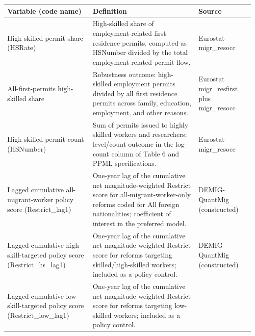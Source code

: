 \documentclass[11pt,a4paper]{article}
\newcounter{none}
\begin{document}
{\scriptsize\setlength{\tabcolsep}{2.5pt}\renewcommand{\arraystretch}{1.00} %
\begin{longtable}[]{@{}
  >{\raggedright\arraybackslash}p{}
  >{\raggedright\arraybackslash}p{}
  >{\raggedright\arraybackslash}p{}@{}}
\toprule\noalign{}
\begin{minipage}[b]{\linewidth}\raggedright
\textbf{Variable (code name)}
\end{minipage} & \begin{minipage}[b]{\linewidth}\raggedright
\textbf{Definition}
\end{minipage} & \begin{minipage}[b]{\linewidth}\raggedright
\textbf{Source}
\end{minipage} \\
\midrule\noalign{}
\endhead
\bottomrule\noalign{}
\endlastfoot
High-skilled permit share (HSRate) & High-skilled share of
employment-related first residence permits, computed as HSNumber divided
by the total employment-related permit flow. & Eurostat migr\_resocc \\
All-first-permits high-skilled share & Robustness outcome: high-skilled
employment permits divided by all first residence permits across family,
education, employment, and other reasons. & Eurostat migr\_resfirst plus
migr\_resocc \\
High-skilled permit count (HSNumber) & Sum of permits issued to highly
skilled workers and researchers; level/count outcome in the log-count
column of Table 6 and PPML specifications. & Eurostat migr\_resocc \\
Lagged cumulative all-migrant-worker policy score (Restrict\_lag1) &
One-year lag of the cumulative net magnitude-weighted Restrict score for
all-migrant-worker-only reforms coded for All foreign nationalities;
coefficient of interest in the preferred model. & DEMIG-QuantMig
(constructed) \\
Lagged cumulative high-skill-targeted policy score (Restrict\_hs\_lag1)
& One-year lag of the cumulative net magnitude-weighted Restrict score
for reforms targeting skilled/high-skilled workers; included as a policy
control. & DEMIG-QuantMig (constructed) \\
Lagged cumulative low-skill-targeted policy score (Restrict\_low\_lag1)
& One-year lag of the cumulative net magnitude-weighted Restrict score
for reforms targeting low-skilled workers; included as a policy control.

\end{longtable}}
\end{document}
